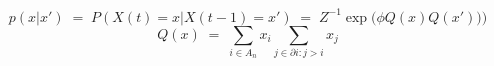 \documentclass[12pt,a4paper]{letter}
\begin{document}
\[ p(x|x')\;=\;P(X(t)=x|X(t-1)=x')\;=\;Z^{-1}\exp\bigg(
   \phi Q(x)Q(x'))\bigg) \]
\[ Q(x)\;=\;\sum_{i\in A_n}x_i\sum_{j\in\partial
   i:j>i}x_j \]
\end{document}

